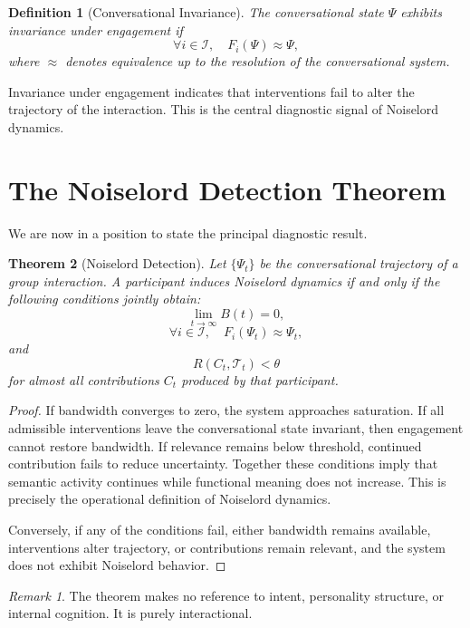 \documentclass[12pt]{article}
\newtheorem{theorem}{Theorem}[section]
\newtheorem{definition}[theorem]{Definition}
\theoremstyle{remark}
\newtheorem*{remark}{Remark}
\begin{document}
\begin{definition}[Conversational Invariance]
The conversational state $\Psi$ exhibits invariance under engagement if
\[
\forall i \in \mathcal{I}, \quad F_i(\Psi) \approx \Psi,
\]
where $\approx$ denotes equivalence up to the resolution of the conversational system.
\end{definition}

Invariance under engagement indicates that interventions fail to alter the trajectory of the interaction. This is the central diagnostic signal of Noiselord dynamics.

\section{The Noiselord Detection Theorem}

We are now in a position to state the principal diagnostic result.

\begin{theorem}[Noiselord Detection]
Let $\{\Psi_t\}$ be the conversational trajectory of a group interaction. A participant induces Noiselord dynamics if and only if the following conditions jointly obtain:
\[
\lim_{t \to \infty} B(t) = 0,
\]
\[
\forall i \in \mathcal{I}, \quad F_i(\Psi_t) \approx \Psi_t,
\]
and
\[
R(C_t,\mathcal{T}_t) < \theta
\]
for almost all contributions $C_t$ produced by that participant.
\end{theorem}

\begin{proof}
If bandwidth converges to zero, the system approaches saturation. If all admissible interventions leave the conversational state invariant, then engagement cannot restore bandwidth. If relevance remains below threshold, continued contribution fails to reduce uncertainty. Together these conditions imply that semantic activity continues while functional meaning does not increase. This is precisely the operational definition of Noiselord dynamics.

Conversely, if any of the conditions fail, either bandwidth remains available, interventions alter trajectory, or contributions remain relevant, and the system does not exhibit Noiselord behavior.
\end{proof}

\begin{remark}
The theorem makes no reference to intent, personality structure, or internal cognition. It is purely interactional.
\end{remark}
\end{document}
